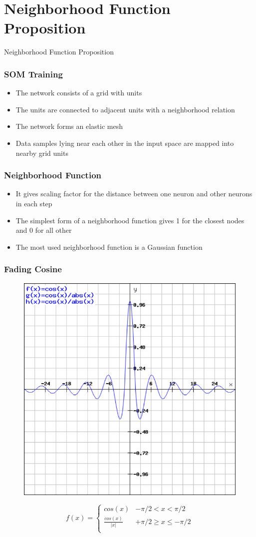 \documentclass{beamer}
\begin{document}
\section{Neighborhood Function Proposition}

\begin{frame}
\center \huge{Neighborhood Function Proposition}
\end{frame}

\begin{frame}
\frametitle{SOM Training}
\begin{itemize}
  \item The network consists of a grid with units
  \item The units are connected to adjacent units with a neighborhood relation
  \item The network forms an elastic mesh
  \item Data samples lying near each other in the input space are mapped into nearby grid units
\end{itemize}
\end{frame}

\begin{frame}
\frametitle{Neighborhood Function}
\begin{itemize}
  \item It gives scaling factor for the distance between one neuron and other neurons in each step
  \item The simplest form of a neighborhood function gives 1 for the closest nodes and 0 for all other
  \item The most used neighborhood function is a Gaussian function
\end{itemize}
\end{frame}

\begin{frame}
\frametitle{Fading Cosine}
\begin{figure}[h]
  \centering
  \includegraphics[width=0.45\linewidth]{fig01a}
\label{fig01a}
\end{figure}
\begin{equation} \label{equ01}
f(x) = 
	\begin{cases} 
		cos(x) & -\pi/2 < x < \pi/2 \\
		\frac{cos(x)}{|x|} & +\pi/2 \geq x \leq -\pi/2 \\
	\end{cases}
\end{equation}
\end{frame}
\end{document}
